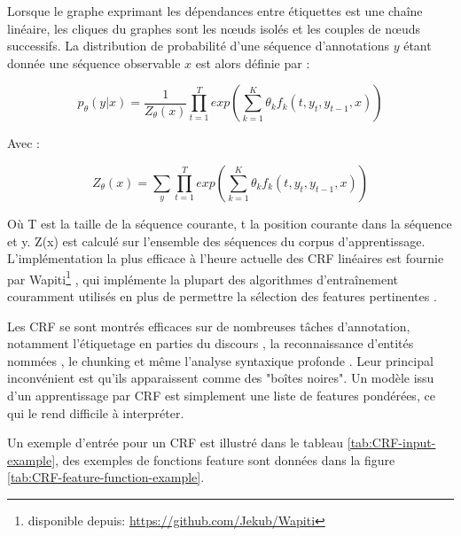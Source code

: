 \documentclass[12pt,a4paper,times,twoside,openright]{report}
\begin{document}
Lorsque le graphe exprimant les dépendances entre étiquettes est une chaîne linéaire, les cliques du graphes sont les n\oe uds isolés et les couples de n\oe uds successifs. La distribution de probabilité d'une séquence d'annotations $y$ étant donnée une séquence observable $x$ est alors définie par :

\begin{equation}\label{eq:linear-CRF}
p_\theta(y|x) = \frac{1}{Z_\theta(x)} \prod^{T}_{t=1} exp \left(\sum^{K}_{k=1} \theta_{k} f_{k}(t, y_{t}, y_{t-1}, x) \right)
\end{equation}

Avec :

\begin{equation}\label{eq:CRF-normalization}
Z_\theta(x) = \sum_{y} \prod^{T}_{t=1} exp \left(\sum^{K}_{k=1} \theta_{k} f_{k}(t, y_{t}, y_{t-1}, x) \right)
\end{equation}

Où T est la taille de la séquence courante, t la position courante dans la séquence et y. Z(x) est calculé sur l'ensemble des séquences du corpus d'apprentissage. L'implémentation la plus efficace à l'heure actuelle des CRF linéaires est fournie par Wapiti\footnote{disponible depuis: \url{https://github.com/Jekub/Wapiti}} \citep{lavergne10}, qui implémente la plupart des algorithmes d'entraînement couramment utilisés en plus de permettre la sélection des features pertinentes%
.

Les CRF se sont montrés efficaces sur de nombreuses tâches d'annotation, notamment l'étiquetage en parties du discours \citep{constant2011integrer}, la reconnaissance d'entités nommées \citep{McCallumLi03,dupont2014reconnaisseur, raymond2013robust}, le chunking \citep{Sha03} et même l'analyse syntaxique profonde \citep{finkel2008efficient,Tsuruoka09}. Leur principal inconvénient est qu'ils apparaissent comme des "boîtes noires". Un modèle issu d'un apprentissage par CRF est simplement une liste de features pondérées, ce qui le rend difficile à interpréter.

Un exemple d'entrée pour un CRF est illustré dans le tableau \ref{tab:CRF-input-example}, des exemples de fonctions feature sont données dans la figure \ref{tab:CRF-feature-function-example}.
\end{document}
